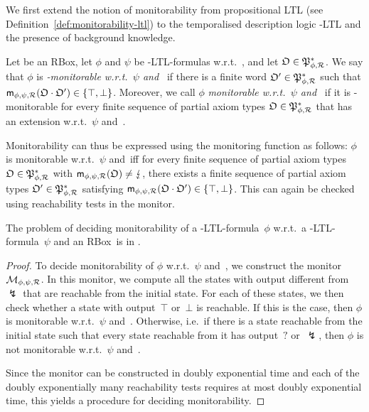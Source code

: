 We first extend the notion of monitorability from propositional LTL (see
Definition~\ref{def:monitorability-ltl}) to the temporalised description logic
\SHOQ-LTL and the presence of background knowledge.

\begin{definition}[Monitorability]
    Let \Rmc be an RBox, let $\phi$ and $\psi$ be \SHOQ-LTL-formulas
    w.r.t.~\Rmc, and let $\mathfrak{O}\in\mathfrak{P}_{\phi,\mathcal{R}}^*$.  We say that $\phi$ is
    \emph{\Omf-monitorable w.r.t.~$\psi$ and~\Rmc} if there is a finite word
    $\mathfrak{O}'\in\mathfrak{P}_{\phi,\mathcal{R}}^*$ such that
    $\mathsf{m}_{\phi,\psi,\mathcal{R}}(\mathfrak{O}\cdot\mathfrak{O}')\in\{\top,\bot\}$.  Moreover, we call
    $\phi$ \emph{monitorable w.r.t.~$\psi$ and~\Rmc} if it is \Omf-monitorable
    for every finite sequence of partial axiom types $\mathfrak{O}\in\mathfrak{P}_{\phi,\mathcal{R}}^*$
    that has an extension w.r.t.~$\psi$ and~\Rmc.
\end{definition}

\noindent
Monitorability can thus be expressed using the monitoring function as follows:
$\phi$ is monitorable w.r.t.~$\psi$ and~\Rmc iff for every finite sequence of
partial axiom types $\mathfrak{O}\in\mathfrak{P}_{\phi,\mathcal{R}}^*$ with
$\mathsf{m}_{\phi,\psi,\mathcal{R}}(\mathfrak{O})\ne\lightning$, there exists a finite sequence of
partial axiom types $\mathfrak{O}'\in\mathfrak{P}_{\phi,\mathcal{R}}^*$ satisfying
$\mathsf{m}_{\phi,\psi,\mathcal{R}}(\mathfrak{O}\cdot\mathfrak{O}')\in\{\top,\bot\}$.
%
This can again be checked using reachability tests in the monitor.

\begin{lemma}\label{lem:monitorability-upper}
    The problem of deciding monitorability of a \SHOQ-LTL-formula~$\phi$ w.r.t.\
    a \SHOQ-LTL-formula~$\psi$ and an RBox~\Rmc is in \TwoExpTime.
\end{lemma}

\begin{proof}
    To decide monitorability of $\phi$ w.r.t.~$\psi$ and~\Rmc, we construct the
    monitor $\mathcal{M}_{\phi,\psi,\mathcal{R}}$.  In this monitor, we compute all the states
    with output different from~$\lightning$ that are reachable from the initial
    state.  For each of these states, we then check whether a state with
    output~$\top$ or~$\bot$ is reachable.  If this is the case, then $\phi$ is
    monitorable w.r.t.~$\psi$ and~\Rmc.  Otherwise, i.e.~if there is a state
    reachable from the initial state such that every state reachable from it has
    output~${?}$ or~$\lightning$, then $\phi$ is not monitorable w.r.t.~$\psi$
    and~\Rmc.

    Since the monitor can be constructed in doubly exponential time and each of
    the doubly exponentially many reachability tests requires at most doubly
    exponential time, this yields a \TwoExpTime procedure for deciding
    monitorability.
\end{proof}

